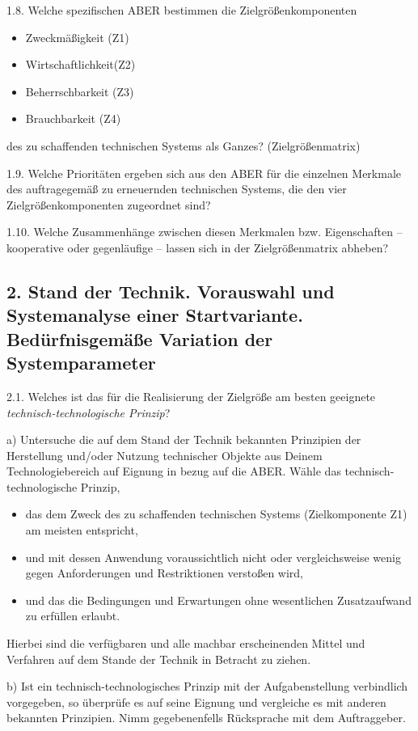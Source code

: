 \documentclass[11pt,a4paper]{article}
\begin{document}
1.8. Welche spezifischen ABER bestimmen die Zielgrößenkomponenten
\begin{itemize}[noitemsep]
\item Zweckmäßigkeit    (Z1) 
\item Wirtschaftlichkeit(Z2) 
\item Beherrschbarkeit  (Z3) 
\item Brauchbarkeit     (Z4) 
\end{itemize}
des zu schaffenden technischen Systems als Ganzes? (Zielgrößenmatrix)

1.9. Welche Prioritäten ergeben sich aus den ABER für die einzelnen 
Merkmale des auftragegemäß zu erneuernden technischen Systems, die 
den vier Zielgrößenkomponenten zugeordnet sind?

1.10. Welche Zusammenhänge zwischen diesen Merkmalen bzw. Eigenschaften --
kooperative oder gegenläufige -- lassen sich in der Zielgrößenmatrix abheben?

\subsection*{2. Stand der Technik. Vorauswahl und Systemanalyse einer
  Startvariante. Bedürfnisgemäße Variation der Systemparameter} 

2.1. Welches ist das für die Realisierung der Zielgröße am besten 
geeignete \emph{technisch-techno\-logische Prinzip}?

a) Untersuche die auf dem Stand der Technik bekannten Prinzipien der
Herstellung und/oder Nutzung technischer Objekte aus Deinem Technologiebereich
auf Eignung in bezug auf die ABER. Wähle das technisch-technologische
Prinzip,
\begin{itemize}
\item das dem Zweck des zu schaffenden technischen Systems (Zielkomponente Z1)
  am meisten entspricht,
\item und mit dessen Anwendung voraussichtlich nicht oder vergleichsweise
  wenig gegen Anforderungen und Restriktionen verstoßen wird,
\item und das die Bedingungen und Erwartungen ohne wesentlichen Zusatzaufwand
  zu erfüllen erlaubt.
\end{itemize}
Hierbei sind die verfügbaren und alle machbar erscheinenden Mittel und
Verfahren auf dem Stande der Technik in Betracht zu ziehen.

b) Ist ein technisch-technologisches Prinzip mit der Aufgabenstellung
verbindlich vorgegeben, so überprüfe es auf seine Eignung und vergleiche es
mit anderen bekannten Prinzipien. Nimm gegebenenfells Rücksprache mit dem
Auftraggeber.
\end{document}

